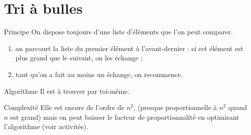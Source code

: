\documentclass[10pt]{beamer}
\begin{document}
\section{Tri à bulles}
\begin{frame}{Principe}
On dispose toujours d'une liste  d'éléments que l'on peut comparer.\\
\begin{enumerate}[--]
	\item on parcourt la liste du premier élément à l'avant-dernier : si cet élément est plus grand que le suivant, on les échange ;
    \item tant qu'on a fait au moins un échange, on recommence.
\end{enumerate}
\end{frame}
\begin{frame}{Algorithme}
Il est à trouver par toi-même.
\end{frame}
\begin{frame}{Complexité}
Elle est encore de l'ordre de $n^2$, (presque proportionnelle à $n^2$ quand $n$ est grand) mais on peut baisser le \og facteur de proportionnalité\fg{} en optimisant l'algorithme (voir activités).
\end{frame}
\end{document}
